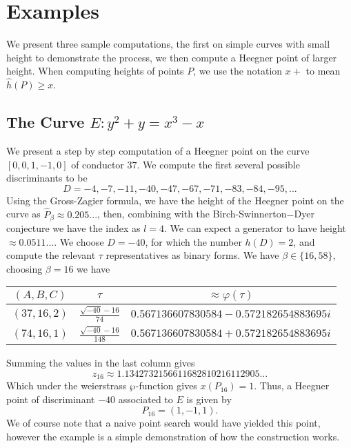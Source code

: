 \section{Examples}
We present three sample computations, the first on simple curves with small height to demonstrate the process, we then compute a Heegner point of larger height. When computing heights of points $P$, we use the notation $x+$ to mean $\hat{h}(P) \ge x$.


\subsection{The Curve $E: y^2 + y = x^3 - x$}
We present a step by step computation of a Heegner point on the curve $[0,0,1,-1,0]$ of conductor $37$. We compute the first several possible discriminants to be
$$D = -4, -7, -11, -40, -47, -67, -71, -83, -84, -95,...$$
Using the Gross-Zagier formula, we have the height of the Heegner point on the curve as $\hat{P}_\beta \approx 0.205...$, then, combining with the Birch-Swinnerton$-$Dyer conjecture we have the index as $l = 4$. We can expect a generator to have height $\approx 0.0511...$. We choose $D = -40$, for which the number $h(D) = 2$, and compute the relevant $\tau$ representatives as binary forms. We have $\beta \in \{16,58\}$, choosing $\beta = 16$ we have
\begin{center}
\begin{tabular}{| c | c | c |}
\hline
$(A,B,C)$& $\tau$ & $\approx\varphi(\tau)$ \\
\hline
$(37, 16, 2)$ & $\frac{\sqrt{-40} - 16}{74}$ & $0.567136607830584 - 0.572182654883695i$\\
$(74, 16, 1)$ &  $\frac{\sqrt{-40} - 16}{148}$ & $0.567136607830584 + 0.572182654883695i$\\
\hline
\end{tabular}
\end{center}
Summing the values in the last column gives 
$$z_{16} \approx 1.1342732156611682810216112905...$$
Which under the weierstrass $\wp$-function gives $x(P_{16}) = 1.$ Thus, a Heegner point of discriminant $-40$ associated to $E$ is given by
$$P_{16} = (1,-1,1).$$
We of course note that a naive point search would have yielded this point, however the example is a simple demonstration of how the construction works.

